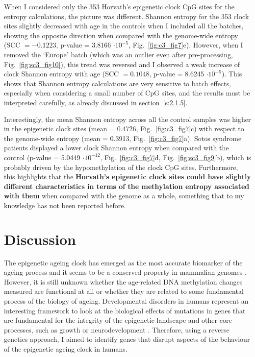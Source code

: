 \bigskip

When I considered only the 353 Horvath's epigenetic clock CpG sites for the entropy calculations, the picture was different. Shannon entropy for the 353 clock sites slightly decreased with age in the controls when I included all the batches, showing the opposite direction when compared with the genome-wide entropy (\acrshort{SCC} $= -0.1223$, p-value = 3.8166 $\cdot 10^{-5}$, Fig.~\ref{fig:c3_fig7}c). However, when I removed the `Europe' batch (which was an outlier even after pre-processing, Fig.~\ref{fig:sc3_fig10}), this trend was reversed and I observed a weak increase of clock Shannon entropy with age (\acrshort{SCC} $= 0.1048$, p-value = 8.6245 $\cdot 10^{-5}$). This shows that Shannon entropy calculations are very sensitive to batch effects, especially when considering a small number of CpG sites, and the results must be interpreted carefully, as already discussed in section~\ref{s:2.1.5}.

\bigskip

Interestingly, the mean Shannon entropy across all the control samples was higher in the epigenetic clock sites (mean = 0.4726, Fig.~\ref{fig:c3_fig7}c) with respect to the genome-wide entropy (mean = 0.3913, Fig.~\ref{fig:c3_fig7}a). Sotos syndrome patients displayed a lower clock Shannon entropy when compared with the control (p-value = 5.0449 $\cdot 10^{-12}$, Fig.~\ref{fig:c3_fig7}d, Fig.~\ref{fig:sc3_fig9}b), which is probably driven by the hypomethylation of the clock CpG sites. Furthermore, this highlights that the \textbf{Horvath's epigenetic clock sites could have slightly different characteristics in terms of the methylation entropy associated with them} when compared with the genome as a whole, something that to my knowledge has not been reported before.

\smallskip

\section{Discussion}

\smallskip

The epigenetic ageing clock has emerged as the most accurate biomarker of the ageing process and it seems to be a conserved property in mammalian genomes \citep{Horvath2018,Field2018}. However, it is still unknown whether the age-related DNA methylation changes measured are functional at all or whether they are related to some fundamental process of the biology of ageing. Developmental disorders in humans represent an interesting framework to look at the biological effects of mutations in genes that are fundamental for the integrity of the epigenetic landscape and other core processes, such as growth or neurodevelopment \citep{Aref-Eshghi2018,Bjornsson2015}. Therefore, using a reverse genetics approach, I aimed to identify genes that disrupt aspects of the behaviour of the epigenetic ageing clock in humans.

